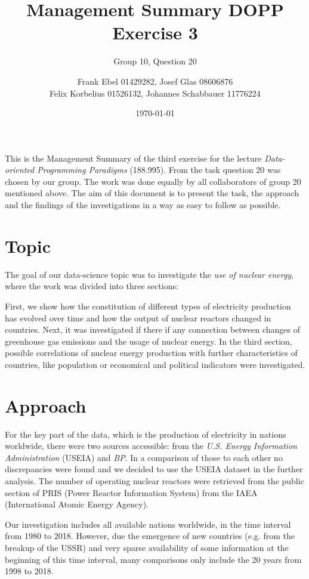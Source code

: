 \documentclass[a4paper,10pt,twocolumn]{scrartcl}
\author{Frank Ebel 01429282, Josef Glas 08606876\\Felix Korbelius 01526132, Johannes Schabbauer 11776224}
\title{\vspace*{-1cm}Management Summary DOPP Exercise 3}
\subtitle{Group 10, Question 20}
\date{\today \vspace*{-0.8cm}}
\begin{document}
\sffamily
\maketitle

This is the Management Summary of the third exercise for the lecture \emph{Data-oriented Programming Paradigms} (188.995).  From the task question 20 was chosen by our group. The work was done equally by all collaborators of group 20 mentioned above. The aim of this document is to present the task, the approach and the findings of the investigations in a way as easy to follow as possible.

\section{Topic}

The goal of our data-science topic was to investigate the \emph{use of nuclear energy}, where the work was divided into three sections:

First, we show how the constitution of different types of electricity production has evolved over time and how the output of nuclear reactors changed in countries. Next, it was investigated if there if any connection between changes of greenhouse gas emissions and the usage of nuclear energy. In the third section, possible correlations of nuclear energy production with further characteristics of countries, like population or economical and political indicators were investigated.

\section{Approach}

For the key part of the data, which is the production of electricity in nations worldwide, there were two sources accessible: from the \emph{U.S. Energy Information Administration} (USEIA) and \emph{BP}. In a comparison of those to each other no discrepancies were found and we decided to use the USEIA dataset in the further analysis. 
The number of operating nuclear reactors were retrieved from the public section of PRIS (Power Reactor Information System) from the IAEA (International Atomic Energy Agency).

Our investigation includes all available nations worldwide, in the time interval from 1980 to 2018. However, due the emergence of new countries (e.g. from the breakup of the USSR) and very sparse availability of some information at the beginning of this time interval, many comparisons only include the 20 years from 1998 to 2018. 
\end{document}
